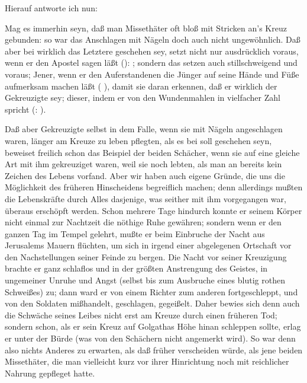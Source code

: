 \begin{aufza}
\begin{aufzb}
Hierauf antworte ich nun:
\begin{aufzc}
\item Mag es immerhin seyn, daß man Missethäter oft bloß mit Stricken an's Kreuz gebunden: so war das Anschlagen mit Nägeln doch auch nicht ungewöhnlich. Daß aber bei  wirklich das Letztere geschehen sey, setzt nicht nur  ausdrücklich voraus, wenn er den Apostel  sagen läßt (): ; sondern das setzen auch stillschweigend  und  voraus; Jener, wenn er den Auferstandenen die Jünger auf seine Hände und Füße aufmerksam machen läßt ( ), damit sie daran erkennen, daß er wirklich der Gekreuzigte sey; dieser, indem er von den Wundenmahlen  in vielfacher Zahl spricht (: ).
\item Daß aber Gekreuzigte selbst in dem Falle, wenn sie mit Nägeln angeschlagen waren, länger am Kreuze zu leben pflegten, als es bei  soll geschehen seyn, beweiset freilich schon das Beispiel der beiden Schächer, wenn sie auf eine gleiche Art mit ihm gekreuziget waren, weil sie noch lebten, als man an  bereits kein Zeichen des Lebens vorfand.
Aber wir haben auch eigene Gründe, die uns die Möglichkeit des früheren Hinscheidens  begreiflich machen; denn allerdings mußten die Lebenskräfte  durch Alles dasjenige, was seither mit ihm vorgegangen war, überaus erschöpft werden. Schon mehrere Tage hindurch konnte er seinem Körper nicht einmal zur Nachtzeit die nöthige Ruhe gewähren; sondern wenn er den ganzen Tag im Tempel gelehrt, mußte er beim Einbruche der Nacht aus Jerusalems Mauern flüchten, um sich in irgend einer abgelegenen Ortschaft vor den Nachstellungen seiner Feinde zu bergen. Die Nacht vor seiner Kreuzigung brachte er ganz schlaflos und in der größten Anstrengung des Geistes, in ungemeiner Unruhe und Angst (selbst bis zum Ausbruche eines blutig rothen Schweißes) zu; dann ward er von einem Richter zum anderen fortgeschleppt, und von den Soldaten mißhandelt, geschlagen, gegeißelt. Daher bewies sich denn auch die Schwäche seines Leibes nicht erst am Kreuze durch einen früheren Tod; sondern schon, als er sein Kreuz auf Golgathas Höhe hinan schleppen sollte, erlag er unter der Bürde (was von den Schächern nicht angemerkt wird). So war denn also nichts Anderes zu erwarten, als daß  früher verscheiden würde, als jene beiden Missethäter, die man vielleicht kurz vor ihrer Hinrichtung noch mit reichlicher Nahrung gepfleget hatte.

\end{aufzc}
\end{aufzb}
\end{aufza}

